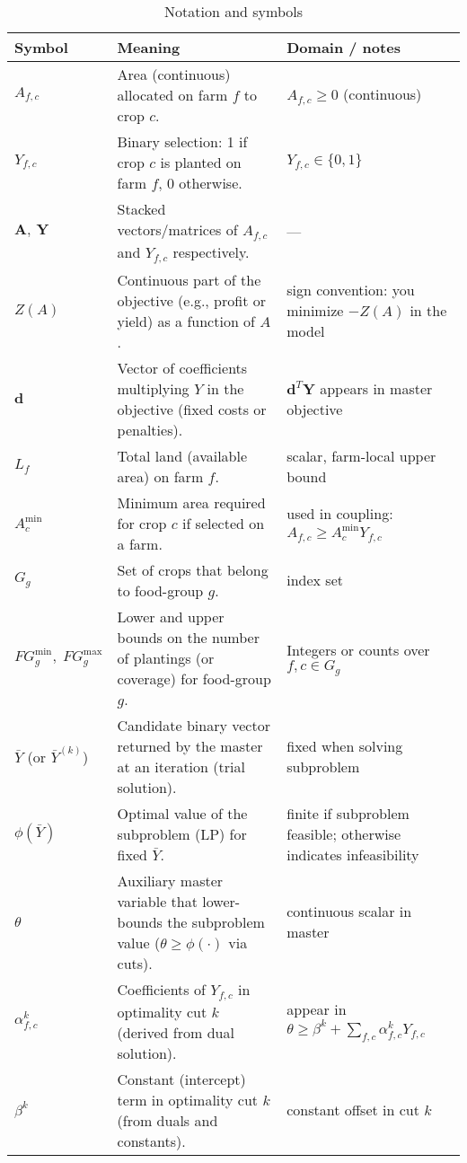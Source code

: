 \begin{table}[ht]
\centering
\caption{Notation and symbols}
\label{tab:notation}
\small
\begin{tabular}{@{} l p{8.5cm} l @{}} \toprule
\textbf{Symbol} & \textbf{Meaning} & \textbf{Domain / notes} \\ \midrule
$A_{f,c}$ & Area (continuous) allocated on farm $f$ to crop $c$. & $A_{f,c}\ge0$ (continuous) \\
$Y_{f,c}$ & Binary selection: 1 if crop $c$ is planted on farm $f$, 0 otherwise. & $Y_{f,c}\in\{0,1\}$ \\
$\mathbf{A},\:\mathbf{Y}$ & Stacked vectors/matrices of $A_{f,c}$ and $Y_{f,c}$ respectively. & — \\
$Z(A)$ & Continuous part of the objective (e.g., profit or yield) as a function of $A$. & sign convention: you minimize $-Z(A)$ in the model \\ 
$\mathbf{d}$ & Vector of coefficients multiplying $Y$ in the objective (fixed costs or penalties). & $\mathbf{d}^T\mathbf{Y}$ appears in master objective \\ 
$L_f$ & Total land (available area) on farm $f$. & scalar, farm-local upper bound \\ 
$A^{\min}_c$ & Minimum area required for crop $c$ if selected on a farm. & used in coupling: $A_{f,c}\ge A^{\min}_c Y_{f,c}$ \\ 
$G_g$ & Set of crops that belong to food-group $g$. & index set \\ 
$FG^{\min}_g,\; FG^{\max}_g$ & Lower and upper bounds on the number of plantings (or coverage) for food-group $g$. & Integers or counts over $f,c\in G_g$ \\ 
$\bar Y$ (or $\bar Y^{(k)}$) & Candidate binary vector returned by the master at an iteration (trial solution). & fixed when solving subproblem \\ 
$\phi(\bar Y)$ & Optimal value of the subproblem (LP) for fixed $\bar Y$. & finite if subproblem feasible; otherwise indicates infeasibility \\ 
$\theta$ & Auxiliary master variable that lower-bounds the subproblem value ($\theta\ge\phi(\cdot)$ via cuts). & continuous scalar in master \\ 
$\alpha^k_{f,c}$ & Coefficients of $Y_{f,c}$ in optimality cut $k$ (derived from dual solution). & appear in $\theta \ge \beta^k + \sum_{f,c}\alpha^k_{f,c}Y_{f,c}$ \\ 
$\beta^k$ & Constant (intercept) term in optimality cut $k$ (from duals and constants). & constant offset in cut $k$ \\ 

\end{tabular}
\end{table}
